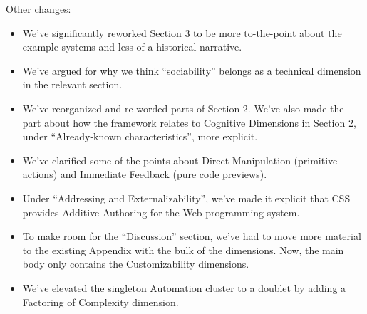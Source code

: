 Other changes:

\begin{itemize}
\tightlist
\item
  We've significantly reworked Section 3 to be more to-the-point about
  the example systems and less of a historical narrative.
\item
  We've argued for why we think ``sociability'' belongs as a technical
  dimension in the relevant section.
\item
  We've reorganized and re-worded parts of Section 2. We've also made
  the part about how the framework relates to Cognitive Dimensions in
  Section 2, under ``Already-known characteristics'', more explicit.
\item
  We've clarified some of the points about Direct Manipulation
  (primitive actions) and Immediate Feedback (pure code previews).
\item
  Under ``Addressing and Externalizability'', we've made it explicit
  that CSS provides Additive Authoring for the Web programming system.
\item
  To make room for the ``Discussion'' section, we've had to move more
  material to the existing Appendix with the bulk of the dimensions.
  Now, the main body only contains the Customizability dimensions.
\item
  We've elevated the singleton Automation cluster to a doublet by adding
  a Factoring of Complexity dimension.
\end{itemize}

